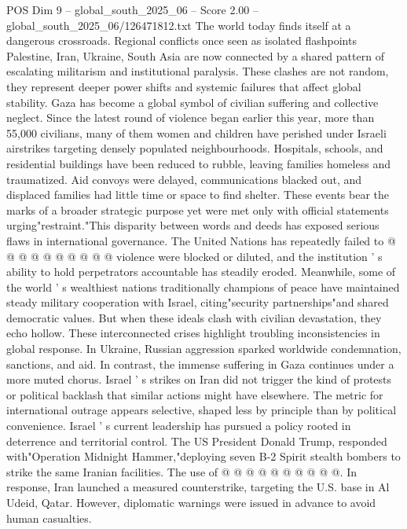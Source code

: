 \begin{textsample}{POS Dim 9 – global\_south\_2025\_06 – Score 2.00 – global\_south\_2025\_06/126471812.txt}  \label{ex:f9_pos_186}
The world today finds itself at a dangerous crossroads.
Regional conflicts once seen as isolated flashpoints Palestine, Iran, Ukraine, South Asia are now connected by a shared pattern of escalating militarism and institutional paralysis.
These clashes are not random, they represent deeper power shifts and systemic failures that affect global stability.
Gaza has become a global symbol of civilian suffering and collective neglect.
Since the latest round of violence began earlier this year, more than 55,000 civilians, many of them women and children have perished under Israeli airstrikes targeting densely populated neighbourhoods.
Hospitals, schools, and residential buildings have been reduced to rubble, leaving families homeless and traumatized.
Aid convoys were delayed, communications blacked out, and displaced families had little time or space to find shelter.
These events bear the marks of a broader strategic purpose yet were met only with official statements urging"restraint."This disparity between words and deeds has exposed serious flaws in international governance.
The United Nations has repeatedly failed to @ @ @ @ @ @ @ @ @ @ violence were blocked or diluted, and the institution ' s ability to hold perpetrators accountable has steadily eroded.
Meanwhile, some of the world ' s wealthiest nations traditionally champions of peace have maintained steady military cooperation with Israel, citing"security partnerships"and shared democratic values.
But when these ideals clash with civilian devastation, they echo hollow.
These interconnected crises highlight troubling inconsistencies in global response.
In Ukraine, Russian aggression sparked worldwide condemnation, sanctions, and aid.
In contrast, the immense suffering in Gaza continues under a more muted chorus.
Israel ' s strikes on Iran did not trigger the kind of protests or political backlash that similar actions might have elsewhere.
The metric for international outrage appears selective, shaped less by principle than by political convenience.
Israel ' s current leadership has pursued a policy rooted in deterrence and territorial control.
The US President Donald Trump, responded with"Operation Midnight Hammer,"deploying seven B-2 Spirit stealth bombers to strike the same Iranian facilities.
The use of @ @ @ @ @ @ @ @ @ @.
In response, Iran launched a measured counterstrike, targeting the U.S. base in Al Udeid, Qatar.
However, diplomatic warnings were issued in advance to avoid human casualties.

\end{textsample}
